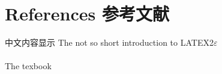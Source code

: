 
\section{References 参考文献}
\begin{frame}[allowframebreaks]
	\ftitle{\textcolor{white}{Bibliography}}
	中文内容显示
	The not so short introduction to LATEX2$\varepsilon$ \cite{Oetiker2015Latex} \\
	~\\
	The texbook \cite{knuth1984texbook}
    \label{Reference}
\end{frame}